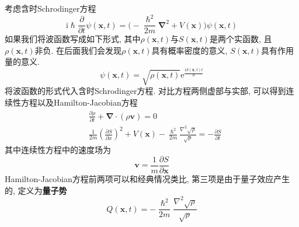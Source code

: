         考虑含时Schrodinger方程
        \begin{equation}
            \mathrm{i}\hslash \frac {\partial}{\partial t} \psi(\bm{x},t) = \bigg( - \frac {\hslash^2}{2m}\bm{\nabla}^2 + V(\bm{x})\bigg) \psi(\bm{x},t)
        \end{equation}
        如果我们将波函数写成如下形式, 其中$\rho(\bm{x},t)$与$S(\bm{x},t)$是两个实函数, 且$\rho(\bm{x},t)$非负. 在后面我们会发现$\rho(\bm{x},t)$具有概率密度的意义, $S(\bm{x},t)$具有作用量的意义. 
        \begin{equation}
            \psi(\bm{x},t) = \sqrt{\rho(\bm{x},t)} \mathrm{e}^{\frac {\mathrm{i}S(\bm{x},t)t}{\hslash}}
        \end{equation}
        将波函数的形式代入含时Schrodinger方程. 对比方程两侧虚部与实部, 可以得到连续性方程以及Hamilton-Jacobian方程
        \begin{equation}\begin{aligned}
            &\frac {\partial \rho}{\partial t} + \bm{\nabla} \cdot (\rho \bm{v}) = 0 \\
            &\frac {1}{2m} \left(\frac {\partial S}{\partial x} \right)^2 + V(\bm{x}) - \frac {\hslash^2}{2m} \frac {\nabla^2 \sqrt{\rho}}{\sqrt{\rho}} = -\frac {\partial S}{\partial t}
        \end{aligned}\end{equation}
        其中连续性方程中的速度场为
        \begin{equation}
            \bm{v} = \frac 1m \frac {\partial S}{\partial \bm{x}}
        \end{equation}
        Hamilton-Jacobian方程前两项可以和经典情况类比, 第三项是由于量子效应产生的, 定义为\textbf{量子势}
        \begin{equation}
            Q(\bm{x},t) = - \frac {\hslash^2}{2m} \frac {\nabla^2 \sqrt{\rho}}{\sqrt{\rho}}
        \end{equation}

